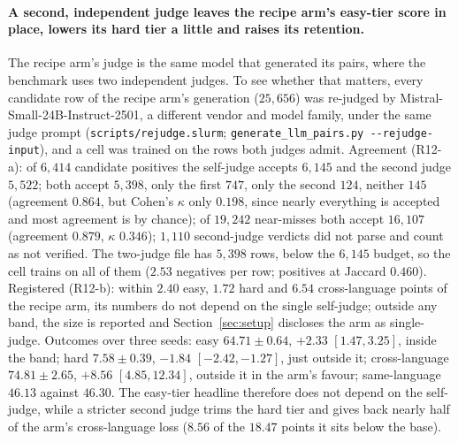 \paragraph{A second, independent judge leaves the recipe arm's easy-tier score in place, lowers its hard tier a little and raises its retention.}
The recipe arm's judge is the same model that generated its pairs, where the benchmark uses two independent judges. To see whether that matters, every candidate row of the recipe arm's generation ($25{,}656$) was re-judged by Mistral-Small-24B-Instruct-2501, a different vendor and model family, under the same judge prompt (\texttt{scripts/rejudge.slurm}; \texttt{generate\_llm\_pairs.py -{}-rejudge-input}), and a cell was trained on the rows both judges admit. Agreement (R12-a): of $6{,}414$ candidate positives the self-judge accepts $6{,}145$ and the second judge $5{,}522$; both accept $5{,}398$, only the first $747$, only the second $124$, neither $145$ (agreement $0.864$, but Cohen's $\kappa$ only $0.198$, since nearly everything is accepted and most agreement is by chance); of $19{,}242$ near-misses both accept $16{,}107$ (agreement $0.879$, $\kappa$ $0.346$); $1{,}110$ second-judge verdicts did not parse and count as not verified. The two-judge file has $5{,}398$ rows, below the $6{,}145$ budget, so the cell trains on all of them ($2.53$ negatives per row; positives at Jaccard $0.460$). Registered (R12-b): within $2.40$ easy, $1.72$ hard and $6.54$ cross-language points of the recipe arm, its numbers do not depend on the single self-judge; outside any band, the size is reported and Section~\ref{sec:setup} discloses the arm as single-judge. Outcomes over three seeds: easy $64.71 \pm 0.64$, $+2.33$ $[1.47, 3.25]$, inside the band; hard $7.58 \pm 0.39$, $-1.84$ $[-2.42, -1.27]$, just outside it; cross-language $74.81 \pm 2.65$, $+8.56$ $[4.85, 12.34]$, outside it in the arm's favour; same-language $46.13$ against $46.30$. The easy-tier headline therefore does not depend on the self-judge, while a stricter second judge trims the hard tier and gives back nearly half of the arm's cross-language loss ($8.56$ of the $18.47$ points it sits below the base).

